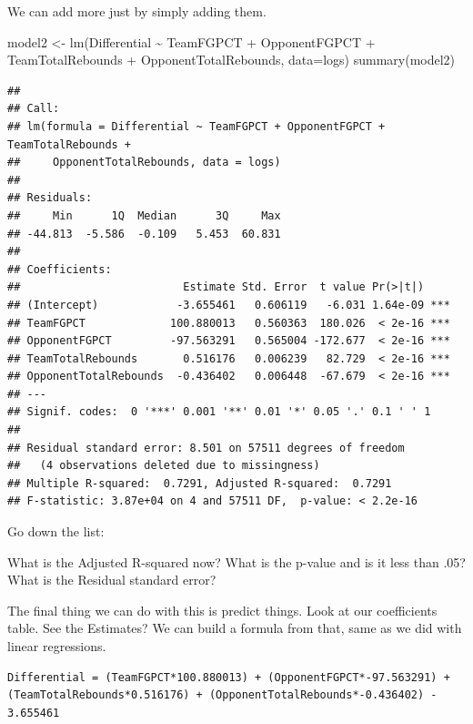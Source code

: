 \documentclass[
]{book}
\newenvironment{Shaded}{\begin{snugshade}}{\end{snugshade}}
\newcommand{\AttributeTok}[1]{\textcolor[rgb]{0.77,0.63,0.00}{#1}}
\newcommand{\FunctionTok}[1]{\textcolor[rgb]{0.00,0.00,0.00}{#1}}
\newcommand{\NormalTok}[1]{#1}
\newcommand{\OtherTok}[1]{\textcolor[rgb]{0.56,0.35,0.01}{#1}}
\newcommand{\SpecialCharTok}[1]{\textcolor[rgb]{0.00,0.00,0.00}{#1}}
\begin{document}
We can add more just by simply adding them.

\begin{Shaded}
\begin{Highlighting}[]
\NormalTok{model2 }\OtherTok{\textless{}{-}} \FunctionTok{lm}\NormalTok{(Differential }\SpecialCharTok{\textasciitilde{}}\NormalTok{ TeamFGPCT }\SpecialCharTok{+}\NormalTok{ OpponentFGPCT }\SpecialCharTok{+}\NormalTok{ TeamTotalRebounds }\SpecialCharTok{+}\NormalTok{ OpponentTotalRebounds, }\AttributeTok{data=}\NormalTok{logs)}
\FunctionTok{summary}\NormalTok{(model2)}
\end{Highlighting}
\end{Shaded}

\begin{verbatim}
## 
## Call:
## lm(formula = Differential ~ TeamFGPCT + OpponentFGPCT + TeamTotalRebounds + 
##     OpponentTotalRebounds, data = logs)
## 
## Residuals:
##     Min      1Q  Median      3Q     Max 
## -44.813  -5.586  -0.109   5.453  60.831 
## 
## Coefficients:
##                         Estimate Std. Error  t value Pr(>|t|)    
## (Intercept)            -3.655461   0.606119   -6.031 1.64e-09 ***
## TeamFGPCT             100.880013   0.560363  180.026  < 2e-16 ***
## OpponentFGPCT         -97.563291   0.565004 -172.677  < 2e-16 ***
## TeamTotalRebounds       0.516176   0.006239   82.729  < 2e-16 ***
## OpponentTotalRebounds  -0.436402   0.006448  -67.679  < 2e-16 ***
## ---
## Signif. codes:  0 '***' 0.001 '**' 0.01 '*' 0.05 '.' 0.1 ' ' 1
## 
## Residual standard error: 8.501 on 57511 degrees of freedom
##   (4 observations deleted due to missingness)
## Multiple R-squared:  0.7291, Adjusted R-squared:  0.7291 
## F-statistic: 3.87e+04 on 4 and 57511 DF,  p-value: < 2.2e-16
\end{verbatim}

Go down the list:

What is the Adjusted R-squared now?
What is the p-value and is it less than .05?
What is the Residual standard error?

The final thing we can do with this is predict things. Look at our coefficients table. See the Estimates? We can build a formula from that, same as we did with linear regressions.

\begin{verbatim}
Differential = (TeamFGPCT*100.880013) + (OpponentFGPCT*-97.563291) + (TeamTotalRebounds*0.516176) + (OpponentTotalRebounds*-0.436402) - 3.655461
\end{verbatim}
\end{document}
